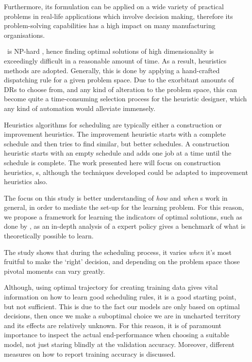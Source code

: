 \documentclass[smallextended]{svjour3}
\begin{document}
Furthermore, its formulation can be applied on a wide variety of practical 
problems in real-life applications which involve decision making, therefore its
problem-solving capabilities has a high impact on many manufacturing 
organisations.

\JSP\ is NP-hard \cite{Garey76:NPhard}, hence finding optimal solutions of high 
dimensionality is exceedingly difficult in a reasonable amount of time. 
As a result, heuristics methods are adopted. Generally, this is done by 
applying a hand-crafted dispatching rule for a given problem space. 
Due to the exorbitant amounts of DRs to choose from, and any kind of alteration 
to the problem space, this can become quite a time-consuming selection process 
for the heuristic designer, which any kind of automation would alleviate 
immensely. 

Heuristics algorithms for scheduling are typically either a construction or 
improvement heuristics. The improvement heuristic starts with a complete 
schedule and then tries to find similar, but better schedules.  A construction 
heuristic starts with an empty schedule and adds one job at a time until the 
schedule is complete. The work presented here will focus on construction 
heuristics, \dr s, although the techniques developed could be adapted to 
improvement
heuristics also. 

The focus on this study is better understanding of \emph{how} and \emph{when} 
\dr s work in general, in order to mediate the set-up for the 
learning problem.
For this reason, we propose a framework for learning the indicators of optimal 
solutions, such as done by \cite{Siggi10}, as an in-depth analysis of a expert 
policy gives a benchmark of what is theoretically possible to learn. 

The study shows that during the scheduling process, it varies \emph{when} it's 
most fruitful to make the `right' decision, and depending on the problem space 
those pivotal moments can vary greatly. 

Although, using optimal trajectory for creating training data gives vital 
information on how to learn good scheduling rules, it is a good starting point, 
but not sufficient. This is due to the fact our models are only based on 
optimal decisions, then once we make a suboptimal choice we are in uncharted 
territory and its effects are relatively unknown. For this reason, it is of 
paramount importance to inspect the actual end-performance when choosing a 
suitable model, not just staring blindly at the validation accuracy. Moreover, 
different measures on how to report training accuracy is discussed.
\end{document}
